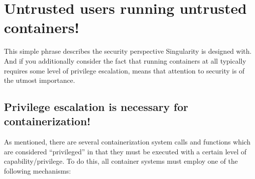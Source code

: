 \documentclass[letterpaper,10pt,english]{sphinxmanual}
\begin{document}
\section{Untrusted users running untrusted containers!}
\label{\detokenize{security:untrusted-users-running-untrusted-containers}}
This simple phrase describes the security perspective Singularity is
designed with. And if you additionally consider the fact that running
containers at all typically requires some level of privilege
escalation, means that attention to security is of the utmost
importance.


\subsection{Privilege escalation is necessary for containerization!}
\label{\detokenize{security:privilege-escalation-is-necessary-for-containerization}}
As mentioned, there are several containerization system calls and
functions which are considered “privileged” in that they must be
executed with a certain level of capability/privilege. To do this, all
container systems must employ one of the following mechanisms:
\end{document}
